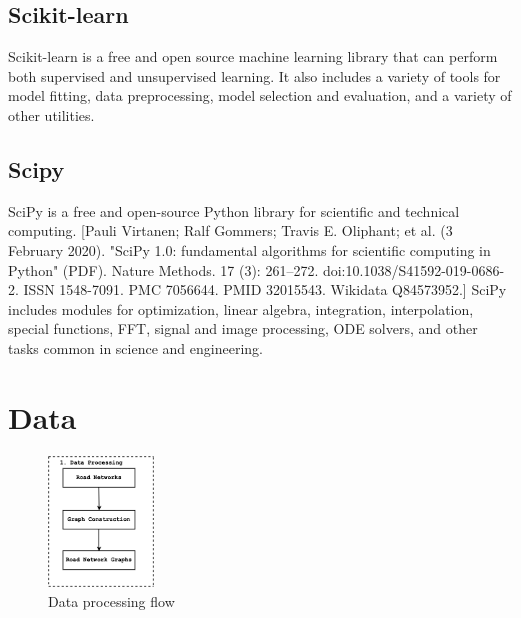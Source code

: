 \subsection{Scikit-learn}
Scikit-learn is a free and open source machine learning library that can perform both supervised and unsupervised learning. It also includes a variety of tools for model fitting, data preprocessing, model selection and evaluation, and a variety of other utilities.

\subsection{Scipy}
SciPy is a free and open-source Python library for scientific and technical computing. [Pauli Virtanen; Ralf Gommers; Travis E. Oliphant; et al. (3 February 2020). "SciPy 1.0: fundamental algorithms for scientific computing in Python" (PDF). Nature Methods. 17 (3): 261–272. doi:10.1038/S41592-019-0686-2. ISSN 1548-7091. PMC 7056644. PMID 32015543. Wikidata Q84573952.] SciPy includes modules for optimization, linear algebra, integration, interpolation, special functions, FFT, signal and image processing, ODE solvers, and other tasks common in science and engineering.

\section{Data}
\begin{figure}[h!]
\centering
\includegraphics[width=0.25\textwidth,center]{picture/flow1.png}
\caption[Miniaturtrichter]{Data processing flow}
\label{fig:flows}
\end{figure}

